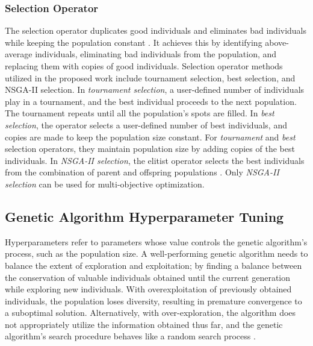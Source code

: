 \subsubsection{Selection Operator}
The selection operator duplicates good individuals and eliminates bad individuals 
while keeping the population constant \cite{deb_multi-objective_2001}. 
It achieves this by identifying above-average individuals, eliminating bad 
individuals from the population, and replacing them with copies of good individuals.
Selection operator methods utilized in the proposed work include tournament 
selection, best selection, and \gls{NSGA-II} selection. 
In \textit{tournament selection}, a user-defined number of individuals play in a
tournament, and the best individual proceeds to the next population. 
The tournament repeats until all the population's spots are filled.
In \textit{best selection}, the operator selects a user-defined number of best 
individuals, and copies are made to keep the population size constant. 
For \textit{tournament} and \textit{best} selection operators, they maintain 
population size by adding copies of the best individuals. 
In \textit{NSGA-II selection}, the elitist operator selects the best individuals 
from the combination of parent and offspring populations \cite{deb_fast_2002}.
Only \textit{NSGA-II selection} can be used for multi-objective optimization. 

\subsection{Genetic Algorithm Hyperparameter Tuning}
Hyperparameters refer to parameters whose value controls 
the genetic algorithm's process, such as the population size. 
A well-performing genetic algorithm needs to balance the extent of exploration and 
exploitation; by finding a balance between the conservation of 
valuable individuals obtained until the current generation while exploring new 
individuals. 
With overexploitation of previously obtained individuals, the population loses 
diversity, resulting in premature convergence to a suboptimal solution. 
Alternatively, with over-exploration, the algorithm does not appropriately utilize 
the information obtained thus far, and the genetic algorithm's search procedure 
behaves like a random search process
\cite{deb_multi-objective_2001}. 

